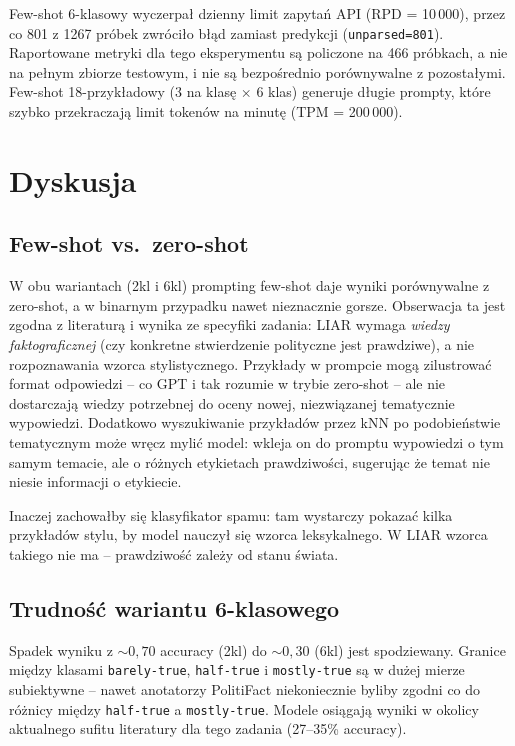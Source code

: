 \documentclass[11pt,a4paper]{article}
\begin{document}
Few-shot 6-klasowy wyczerpał dzienny limit zapytań API (RPD = 10\,000),
przez co 801 z 1267 próbek zwróciło błąd zamiast predykcji
(\texttt{unparsed=801}). Raportowane metryki dla tego eksperymentu są
policzone na 466 próbkach, a nie na pełnym zbiorze testowym, i nie są
bezpośrednio porównywalne z pozostałymi. Few-shot 18-przykładowy (3 na
klasę $\times$ 6 klas) generuje długie prompty, które szybko przekraczają
limit tokenów na minutę (TPM = 200\,000).

\section{Dyskusja}

\subsection{Few-shot vs.\ zero-shot}

W obu wariantach (2kl i 6kl) prompting few-shot daje wyniki porównywalne
z zero-shot, a w binarnym przypadku nawet nieznacznie gorsze. Obserwacja ta
jest zgodna z literaturą i wynika ze specyfiki zadania: LIAR wymaga
\emph{wiedzy faktograficznej} (czy konkretne stwierdzenie polityczne jest
prawdziwe), a nie rozpoznawania wzorca stylistycznego. Przykłady w prompcie
mogą zilustrować format odpowiedzi -- co GPT i tak rozumie w trybie zero-shot
-- ale nie dostarczają wiedzy potrzebnej do oceny nowej, niezwiązanej tematycznie
wypowiedzi. Dodatkowo wyszukiwanie przykładów przez kNN po podobieństwie
tematycznym może wręcz mylić model: wkleja on do promptu wypowiedzi o tym
samym temacie, ale o różnych etykietach prawdziwości, sugerując że temat nie
niesie informacji o etykiecie.

Inaczej zachowałby się klasyfikator spamu: tam wystarczy pokazać kilka
przykładów stylu, by model nauczył się wzorca leksykalnego. W LIAR wzorca
takiego nie ma -- prawdziwość zależy od stanu świata.

\subsection{Trudność wariantu 6-klasowego}

Spadek wyniku z $\sim 0{,}70$ accuracy (2kl) do $\sim 0{,}30$ (6kl) jest
spodziewany. Granice między klasami \texttt{barely-true}, \texttt{half-true}
i \texttt{mostly-true} są w dużej mierze subiektywne -- nawet anotatorzy
PolitiFact niekoniecznie byliby zgodni co do różnicy między \texttt{half-true}
a \texttt{mostly-true}. Modele osiągają wyniki w okolicy aktualnego sufitu
literatury dla tego zadania (27--35\% accuracy).
\end{document}
